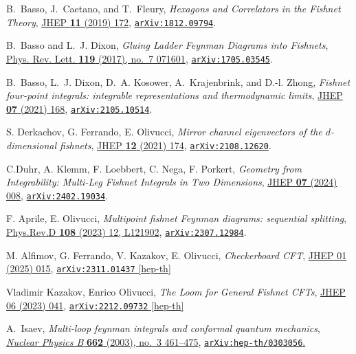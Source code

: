 \documentclass[a4paper,11pt]{article}
\numberwithin{equation}{section}
\begin{document}
\begin{thebibliography}{99}
B.~Basso, J.~Caetano, and T.~Fleury, {\it {Hexagons and Correlators in the
		Fishnet Theory}},  
\href{https://link.springer.com/article/10.1007/JHEP11(2019)172}{JHEP {\bf 11} (2019) 172},
\href{http://arxiv.org/abs/1812.09794}{{\tt \href{https://arxiv.org/abs/1812.09794}{\texttt{arXiv:1812.09794}}}}.

B.~Basso and L.~J. Dixon, {\it {Gluing Ladder Feynman Diagrams into Fishnets}},
\href{https://journals.aps.org/prl/abstract/10.1103/PhysRevLett.119.071601}{Phys. Rev. Lett. {\bf 119} (2017), no.~7 071601},
\href{http://arxiv.org/abs/1705.03545}{{\tt \href{https://arxiv.org/abs/1705.03545}{\texttt{arXiv:1705.03545}}}}.

B.~Basso, L.~J. Dixon, D.~A. Kosower, A.~Krajenbrink, and D.-l. Zhong, {\it
	{Fishnet four-point integrals: integrable representations and thermodynamic
		limits}},  
\href{https://link.springer.com/article/10.1007/JHEP07(2021)168}{JHEP {\bf 07} (2021) 168},
\href{http://arxiv.org/abs/2105.10514}{{\tt \href{https://arxiv.org/abs/2105.10514}{\texttt{arXiv:2105.10514}}}}.

S. Derkachov, G. Ferrando, E. Olivucci,
\textit{Mirror channel eigenvectors of the $d$-dimensional fishnets},
\href{https://doi.org/10.1007/JHEP12%282021%29174}{JHEP \textbf{12} (2021) 174},
\href{https://arxiv.org/abs/2108.12620}{\texttt{arXiv:2108.12620}}.

C.Duhr, A. Klemm, F. Loebbert, C. Nega, F. Porkert,
\textit{Geometry from Integrability: Multi-Leg Fishnet Integrals in Two Dimensions},
\href{https://doi.org/10.1007/JHEP07(2024)008}{JHEP \textbf{07} (2024) 008},
\href{https://arxiv.org/abs/2402.19034}{\texttt{arXiv:2402.19034}}.

F. Aprile, E. Olivucci,
\textit{Multipoint fishnet Feynman diagrams: sequential splitting},
\href{https://doi.org/10.1103/PhysRevD.108.L121902}{Phys.Rev.D \textbf{108} (2023) 12, L121902},
\href{https://arxiv.org/abs/2307.12984}{\texttt{arXiv:2307.12984}}.

M. Alfimov, G. Ferrando, V. Kazakov, E. Olivucci,
\textit{Checkerboard CFT},
\href{https://doi.org/10.1007/JHEP01%282025%29015}{JHEP 01 (2025) 015},
\href{https://arxiv.org/abs/2311.01437}{\texttt{arXiv:2311.01437} [hep-th]}

Vladimir Kazakov, Enrico Olivucci,
\textit{The Loom for General Fishnet CFTs},
\href{https://doi.org/10.1007/JHEP06%282023%29041}{JHEP 06 (2023) 041},
\href{https://arxiv.org/abs/2212.09732}{\texttt{arXiv:2212.09732} [hep-th]}

A.~Isaev, {\it Multi-loop feynman integrals and conformal quantum mechanics},
\href{https://www.sciencedirect.com/science/article/abs/pii/S0550321303003936?via%3Dihub}{{\em Nuclear Physics B} {\bf 662} (2003), no.~3 461--475},
\href{https://arxiv.org/abs/hep-th/0303056}{\texttt{\href{https://arxiv.org/abs/hep-th/0303056}{\texttt{arXiv:hep-th/0303056}}}.}

\end{thebibliography}
\end{document}
